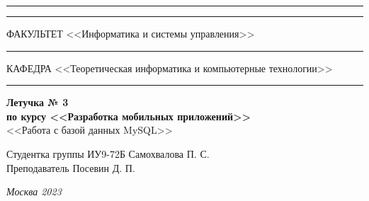 \documentclass[a4paper, 14pt]{extarticle}
\begin{document}
\begin{titlepage}
\vspace{-25pt}
\hspace{-35pt}\rule{\textwidth}{2.3pt}

\vspace*{-20.3pt}
\hspace{-35pt}\rule{\textwidth}{0.4pt}

\vspace{1.5ex}
\hspace{-35pt} \noindent \small ФАКУЛЬТЕТ\hspace{80pt} <<Информатика и системы управления>>

\vspace*{-16pt}
\hspace{47pt}\rule{0.83\textwidth}{0.4pt}

\vspace{0.5ex}
\hspace{-35pt} \noindent \small КАФЕДРА\hspace{50pt} <<Теоретическая информатика и компьютерные технологии>>

\vspace*{-16pt}
\hspace{30pt}\rule{0.866\textwidth}{0.4pt}
  
\vspace{11em}

\begin{center}
\Large {\bf Летучка № 3} \\
\large {\bf по курсу <<Разработка мобильных приложений>>} \\
\large <<Работа с базой данных MySQL>>
\end{center}\normalsize

\vspace{8em}


\begin{flushright}
  {Студентка группы ИУ9-72Б Самохвалова П. С. \hspace*{15pt}\\
  \vspace{2ex}
  Преподаватель Посевин Д. П.\hspace*{15pt}}
\end{flushright}

\bigskip

\vfill
 

\begin{center}
\textsl{Москва 2023}
\end{center}
\end{titlepage}
\end{document}
